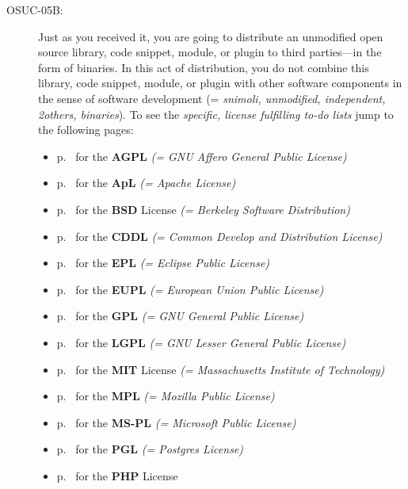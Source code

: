 \begin{description}
\item[OSUC-05B:]\label{OSUC-05B-DEF} Just as you received it, you are going to
distribute an unmodified open source library, code snippet, module, or plugin to
third parties---in the form of binaries. In this act of distribution, you do not
combine this library, code snippet, module, or plugin with other software
components in the sense of software development (= \textit{snimoli, unmodified,
independent, 2others, binaries}). To see the \textit{specific, license
fulfilling to-do lists} jump to the following pages:
  \begin{itemize}
    \item p.\ \pageref{OSUC-05B-AGPL} for the \textbf{AGPL}
      \textit{(= GNU Affero General Public License)} 
    \item p.\ \pageref{OSUC-05B-Apache20} for the \textbf{ApL}
      \textit{(= Apache License)}
    \item p.\ \pageref{OSUC-05B-BSD} for the \textbf{BSD} License
      \textit{(= Berkeley Software Distribution)}
    \item p.\ \pageref{OSUC-05B-CDDL} for the \textbf{CDDL}
      \textit{(= Common Develop and Distribution License)}  
    \item p.\ \pageref{OSUC-05B-EPL} for the \textbf{EPL}
      \textit{(= Eclipse Public License)}     
    \item p.\ \pageref{OSUC-05B-EUPL} for the \textbf{EUPL}
      \textit{(= European Union Public License)} 
    \item p.\ \pageref{OSUC-05B-GPL} for the \textbf{GPL}
       \textit{(= GNU General Public License)} 
    \item p.\ \pageref{OSUC-05B-LGPL} for the \textbf{LGPL}
      \textit{(= GNU Lesser General Public License)}           
    \item p.\ \pageref{OSUC-05B-MIT} for the \textbf{MIT} License
       \textit{(= Massachusetts Institute of Technology)} 
    \item p.\ \pageref{OSUC-05B-MPL} for the \textbf{MPL}
      \textit{(= Mozilla Public License)}     
    \item p.\ \pageref{OSUC-05B-MS-PL} for the \textbf{MS-PL}
      \textit{(= Microsoft Public License)} 
    \item p.\ \pageref{OSUC-05B-PGL} for the \textbf{PGL}
      \textit{(= Postgres License)} 
    \item p.\ \pageref{OSUC-05B-PHP} for the \textbf{PHP} License 
  \end{itemize}



\end{description}
